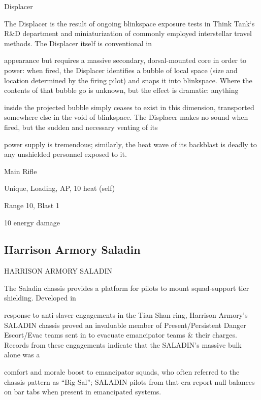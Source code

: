 Displacer  

The Displacer is the result of ongoing blinkspace exposure tests in Think Tank‘s R\&D department and  
miniaturization of commonly employed interstellar travel methods. The Displacer itself is conventional in  

appearance but requires a massive secondary, dorsal-mounted core in order to power: when fired, the  
Displacer identifies a bubble of local space (size and location determined by the firing pilot) and snaps it  
into blinkspace. Where the contents of that bubble go is unknown, but the effect is dramatic: anything  

inside the projected bubble simply ceases to exist in this dimension, transported somewhere else in the  
void of blinkspace. The Displacer makes no sound when fired, but the sudden and necessary venting of its  

                                                                                                                        


power supply is tremendous; similarly, the heat wave of its backblast is deadly to any unshielded personnel  
exposed to it.   

Main Rifle
 
Unique, Loading, AP, 10 heat (self)
 
Range 10, Blast 1
 
10 energy damage
 

                                                                                                                
\subsection{Harrison Armory Saladin}

                                HARRISON ARMORY SALADIN  

The Saladin chassis provides a platform for pilots to mount squad-support tier shielding. Developed in  

response to anti-slaver engagements in the Tian Shan ring, Harrison Armory’s SALADIN chassis proved an  
invaluable member of Present/Persistent Danger Escort/Evac teams sent in to evacuate emancipator teams  
\& their charges. Records from these engagements indicate that the SALADIN’s massive bulk alone was a  

comfort and morale boost to emancipator squads, who often referred to the chassis pattern as “Big Sal”;  
SALADIN pilots from that era report null balances on bar tabs when present in emancipated systems.   

